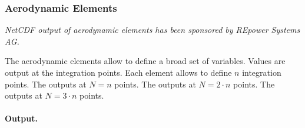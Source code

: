 \subsubsection{Aerodynamic Elements}
\label{sec:NetCDF:Elem:Aerodynamic}
\emph{NetCDF output of aerodynamic elements has been sponsored
by REpower Systems AG.}

The aerodynamic elements allow to define a broad set of variables.
Values are output at the integration points.
Each element allows to define $n$ integration points.
The  outputs at $N = n$ points.
The  outputs at $N = 2 \cdot n$ points.
The  outputs at $N = 3 \cdot n$ points.

\paragraph{Output.}
